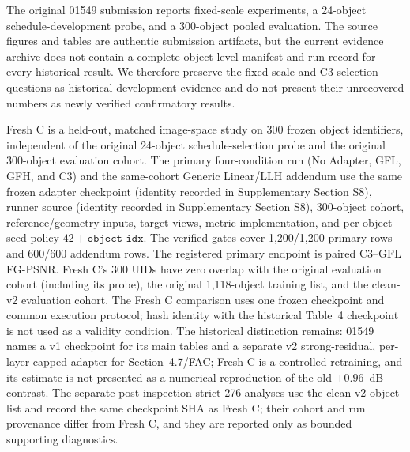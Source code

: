 \documentclass[times,twocolumn,final]{elsarticle}
\begin{document}
The original 01549 submission reports fixed-scale experiments, a 24-object schedule-development probe, and a 300-object pooled evaluation. The source figures and tables are authentic submission artifacts, but the current evidence archive does not contain a complete object-level manifest and run record for every historical result. We therefore preserve the fixed-scale and C3-selection questions as historical development evidence and do not present their unrecovered numbers as newly verified confirmatory results.

Fresh C is a held-out, matched image-space study on 300 frozen object identifiers, independent of the original 24-object schedule-selection probe and the original 300-object evaluation cohort. The primary four-condition run (No Adapter, GFL, GFH, and C3) and the same-cohort Generic Linear/LLH addendum use the same frozen adapter checkpoint (identity recorded in Supplementary Section S8), runner source (identity recorded in Supplementary Section S8), 300-object cohort, reference/geometry inputs, target views, metric implementation, and per-object seed policy $42+\texttt{object\_idx}$. The verified gates cover 1,200/1,200 primary rows and 600/600 addendum rows. The registered primary endpoint is paired C3--GFL FG-PSNR. Fresh C's 300 UIDs have zero overlap with the original evaluation cohort (including its probe), the original 1,118-object training list, and the clean-v2 evaluation cohort. The Fresh C comparison uses one frozen checkpoint and common execution protocol; hash identity with the historical Table~4 checkpoint is not used as a validity condition. The historical distinction remains: 01549 names a v1 checkpoint for its main tables and a separate v2 strong-residual, per-layer-capped adapter for Section~4.7/FAC; Fresh C is a controlled retraining, and its estimate is not presented as a numerical reproduction of the old $+0.96$~dB contrast. The separate post-inspection strict-276 analyses use the clean-v2 object list and record the same checkpoint SHA as Fresh C; their cohort and run provenance differ from Fresh C, and they are reported only as bounded supporting diagnostics.
\end{document}
